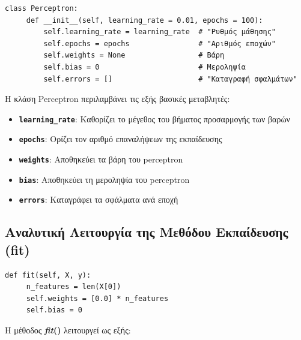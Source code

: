 \documentclass[12pt,a4paper,twoside]{book}
\begin{document}
\begin{tcolorbox}[myCustomStyle = {perceptron.py}]
    \begin{lstlisting}[style=myPythonStyle]
 class Perceptron:
     def __init__(self, learning_rate = 0.01, epochs = 100):
         self.learning_rate = learning_rate  # "Ρυθμός μάθησης"
         self.epochs = epochs                # "Αριθμός εποχών"
         self.weights = None                 # Βάρη
         self.bias = 0                       # Μεροληψία
         self.errors = []                    # "Καταγραφή σφαλμάτων"
    \end{lstlisting}
\end{tcolorbox}

Η κλάση Perceptron περιλαμβάνει τις εξής βασικές μεταβλητές:
\begin{itemize}
    \item \textbf{\texttt{learning\_rate}}: Καθορίζει το μέγεθος του βήματος προσαρμογής των βαρών
    \item \textbf{\texttt{epochs}}: Ορίζει τον αριθμό επαναλήψεων της εκπαίδευσης
    \item \textbf{\texttt{weights}}: Αποθηκεύει τα βάρη του perceptron
    \item \textbf{\texttt{bias}}: Αποθηκεύει τη μεροληψία του perceptron
    \item \textbf{\texttt{errors}}: Καταγράφει τα σφάλματα ανά εποχή
\end{itemize}

\subsection{Αναλυτική Λειτουργία της Μεθόδου Εκπαίδευσης (fit)}

\begin{tcolorbox}[myCustomStyle = {perceptron.py}]
    \begin{lstlisting}[style=myPythonStyle]
 def fit(self, X, y):
     n_features = len(X[0])
     self.weights = [0.0] * n_features
     self.bias = 0
    \end{lstlisting}
\end{tcolorbox}

Η μέθοδος \textbf{\textit{fit}()} λειτουργεί ως εξής: %
\end{document}
